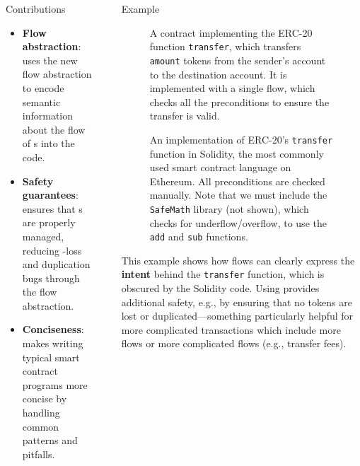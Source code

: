 \documentclass[usenames, dvipsnames, final]{beamer}
\newlength{\sepwidth}
\newlength{\colwidth}
\newcommand{\separatorcolumn}{\begin{column}{\sepwidth}\end{column}}
\begin{document}
\begin{frame}[t]
\begin{columns}[t]
\begin{column}{\colwidth}
    \begin{alertblock}{Contributions}
        \begin{itemize}
            \item \textbf{Flow abstraction}: \langName uses the new flow abstraction to encode semantic information about the flow of \assetTxt{}s into the code.
            \item \textbf{Safety guarantees}: \langName ensures that \assetTxt{}s are properly managed, reducing \assetTxt-loss and duplication bugs through the flow abstraction.
            \item \textbf{Conciseness}: \langName makes writing typical smart contract programs more concise by handling common patterns and pitfalls.
        \end{itemize}
    \end{alertblock}
\end{column}

\separatorcolumn

\begin{column}{\colwidth}

  \begin{block}{Example}
    \begin{figure}[h]
        \centering
        
        \caption{A \langName contract implementing the ERC-20 function \lstinline{transfer}, which transfers \lstinline{amount} tokens from the sender's account to the destination account.
            It is implemented with a single flow, which checks all the preconditions to ensure the transfer is valid.}
        \label{fig:erc20-transfer-flow}
    \end{figure}
    \begin{figure}[h]
        \centering
        
        \caption{An implementation of ERC-20's \lstinline{transfer} function in Solidity, the most commonly used smart contract language on Ethereum.
            All preconditions are checked manually.
            Note that we must include the \lstinline{SafeMath} library (not shown), which checks for underflow/overflow, to use the \lstinline{add} and \lstinline{sub} functions.}
        \label{fig:erc20-transfer-sol}
    \end{figure}

      This example shows how flows can clearly express the \textbf{intent} behind the \lstinline{transfer} function, which is obscured by the Solidity code.
      Using \langName provides additional safety, e.g., by ensuring that no tokens are lost or duplicated---something particularly helpful for more complicated transactions which include more flows or more complicated flows (e.g., transfer fees).
  \end{block}
\end{column}


\end{columns}
\end{frame}
\end{document}
